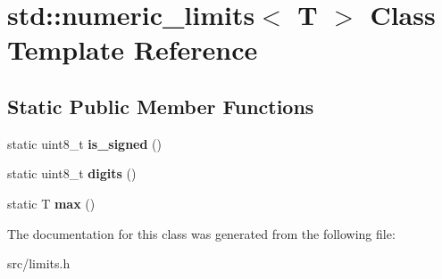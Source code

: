 \hypertarget{classstd_1_1numeric__limits}{}\section{std\+:\+:numeric\+\_\+limits$<$ T $>$ Class Template Reference}
\label{classstd_1_1numeric__limits}
\subsection*{Static Public Member Functions}
\begin{DoxyCompactItemize}
\item 
static uint8\+\_\+t {\bfseries is\+\_\+signed} ()\hypertarget{classstd_1_1numeric__limits_a0c0397b435b08d7f7b629dc264ad6b39}{}\label{classstd_1_1numeric__limits_a0c0397b435b08d7f7b629dc264ad6b39}

\item 
static uint8\+\_\+t {\bfseries digits} ()\hypertarget{classstd_1_1numeric__limits_aa7a4f181eb6e5b26661ed2c6c6ab653b}{}\label{classstd_1_1numeric__limits_aa7a4f181eb6e5b26661ed2c6c6ab653b}

\item 
static T {\bfseries max} ()\hypertarget{classstd_1_1numeric__limits_ae5fc707d9d6ebbac808a5fb6e26690f8}{}\label{classstd_1_1numeric__limits_ae5fc707d9d6ebbac808a5fb6e26690f8}

\end{DoxyCompactItemize}


The documentation for this class was generated from the following file\+:\begin{DoxyCompactItemize}
\item 
src/limits.\+h\end{DoxyCompactItemize}
